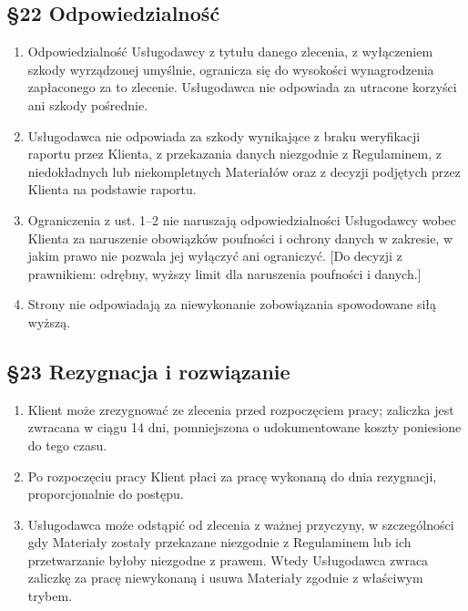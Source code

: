 \documentclass[11pt,a4paper]{article}
\begin{document}
\subsection*{§22 Odpowiedzialność}
\begin{enumerate}
\item Odpowiedzialność Usługodawcy z tytułu danego zlecenia, z wyłączeniem szkody wyrządzonej umyślnie, ogranicza się do wysokości wynagrodzenia zapłaconego za to zlecenie. Usługodawca nie odpowiada za utracone korzyści ani szkody pośrednie.
\item Usługodawca nie odpowiada za szkody wynikające z braku weryfikacji raportu przez Klienta, z przekazania danych niezgodnie z Regulaminem, z niedokładnych lub niekompletnych Materiałów oraz z decyzji podjętych przez Klienta na podstawie raportu.
\item Ograniczenia z ust. 1–2 nie naruszają odpowiedzialności Usługodawcy wobec Klienta za naruszenie obowiązków poufności i ochrony danych w zakresie, w jakim prawo nie pozwala jej wyłączyć ani ograniczyć. [Do decyzji z prawnikiem: odrębny, wyższy limit dla naruszenia poufności i danych.]
\item Strony nie odpowiadają za niewykonanie zobowiązania spowodowane siłą wyższą.
\end{enumerate}

\subsection*{§23 Rezygnacja i rozwiązanie}
\begin{enumerate}
\item Klient może zrezygnować ze zlecenia przed rozpoczęciem pracy; zaliczka jest zwracana w ciągu 14 dni, pomniejszona o udokumentowane koszty poniesione do tego czasu.
\item Po rozpoczęciu pracy Klient płaci za pracę wykonaną do dnia rezygnacji, proporcjonalnie do postępu.
\item Usługodawca może odstąpić od zlecenia z ważnej przyczyny, w szczególności gdy Materiały zostały przekazane niezgodnie z Regulaminem lub ich przetwarzanie byłoby niezgodne z prawem. Wtedy Usługodawca zwraca zaliczkę za pracę niewykonaną i usuwa Materiały zgodnie z właściwym trybem.
\end{enumerate}
\end{document}
